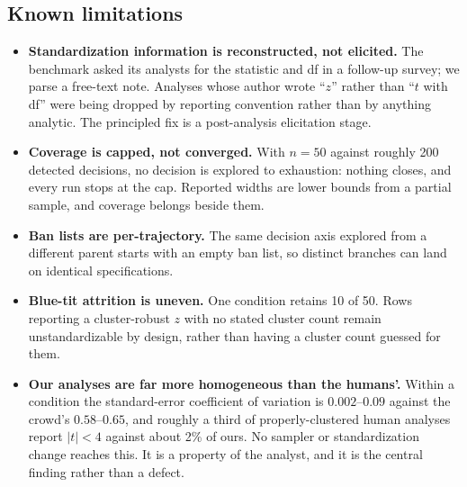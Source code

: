 \documentclass{article}
\begin{document}
\subsection{Known limitations}
\label{sec:setup-limits}

\begin{itemize}
\item \textbf{Standardization information is reconstructed, not elicited.} The
benchmark asked its analysts for the statistic and df in a follow-up survey; we
parse a free-text note. Analyses whose author wrote ``$z$'' rather than ``$t$
with df'' were being dropped by reporting convention rather than by anything
analytic. The principled fix is a post-analysis elicitation stage.
\item \textbf{Coverage is capped, not converged.} With $n = 50$ against roughly
200 detected decisions, no decision is explored to exhaustion: nothing closes,
and every run stops at the cap. Reported widths are lower bounds from a partial
sample, and coverage belongs beside them.
\item \textbf{Ban lists are per-trajectory.} The same decision axis explored
from a different parent starts with an empty ban list, so distinct branches can
land on identical specifications.
\item \textbf{Blue-tit attrition is uneven.} One condition retains 10 of 50.
Rows reporting a cluster-robust $z$ with no stated cluster count remain
unstandardizable by design, rather than having a cluster count guessed for them.
\item \textbf{Our analyses are far more homogeneous than the humans'.} Within a
condition the standard-error coefficient of variation is $0.002$--$0.09$ against
the crowd's $0.58$--$0.65$, and roughly a third of properly-clustered human
analyses report $|t| < 4$ against about 2\% of ours. No sampler or
standardization change reaches this. It is a property of the analyst, and it is
the central finding rather than a defect.
\end{itemize}



\end{document}
